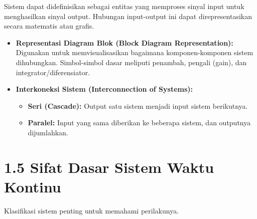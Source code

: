 \documentclass[
  letterpaper,
  DIV=11,
  numbers=noendperiod]{scrreprt}
\providecommand{\tightlist}{%
  \setlength{\itemsep}{0pt}\setlength{\parskip}{0pt}}
\begin{document}
Sistem dapat didefinisikan sebagai entitas yang memproses sinyal input
untuk menghasilkan sinyal output. Hubungan input-output ini dapat
direpresentasikan secara matematis atau grafis.

\begin{itemize}
\tightlist
\item
  \textbf{Representasi Diagram Blok (Block Diagram Representation):}
  Digunakan untuk memvisualisasikan bagaimana komponen-komponen sistem
  dihubungkan. Simbol-simbol dasar meliputi penambah, pengali (gain),
  dan integrator/diferensiator.
\item
  \textbf{Interkoneksi Sistem (Interconnection of Systems):}

  \begin{itemize}
  \tightlist
  \item
    \textbf{Seri (Cascade):} Output satu sistem menjadi input sistem
    berikutnya.
  \item
    \textbf{Paralel:} Input yang sama diberikan ke beberapa sistem, dan
    outputnya dijumlahkan.
  \end{itemize}
\end{itemize}

\section{1.5 Sifat Dasar Sistem Waktu
Kontinu}\label{sifat-dasar-sistem-waktu-kontinu}

Klasifikasi sistem penting untuk memahami perilakunya.
\end{document}
